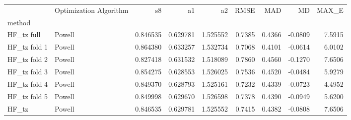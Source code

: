 \begin{tabular}{llrrrrrrr}
 & Optimization Algorithm & s8 & a1 & a2 & RMSE & MAD & MD & MAX_E \\
method &  &  &  &  &  &  &  &  \\
HF_tz full & Powell & 0.846535 & 0.629781 & 1.525552 & 0.7385 & 0.4366 & -0.0809 & 7.5915 \\
HF_tz fold 1 & Powell & 0.864380 & 0.633257 & 1.532734 & 0.7068 & 0.4101 & -0.0614 & 6.0102 \\
HF_tz fold 2 & Powell & 0.827418 & 0.631532 & 1.518089 & 0.7860 & 0.4560 & -0.1270 & 7.6506 \\
HF_tz fold 3 & Powell & 0.854275 & 0.628553 & 1.526025 & 0.7536 & 0.4520 & -0.0484 & 5.9279 \\
HF_tz fold 4 & Powell & 0.849370 & 0.628793 & 1.525161 & 0.7232 & 0.4339 & -0.0723 & 4.4952 \\
HF_tz fold 5 & Powell & 0.849998 & 0.629670 & 1.526598 & 0.7378 & 0.4390 & -0.0949 & 5.6200 \\
HF_tz & Powell & 0.846535 & 0.629781 & 1.525552 & 0.7415 & 0.4382 & -0.0808 & 7.6506 \\
\end{tabular}
